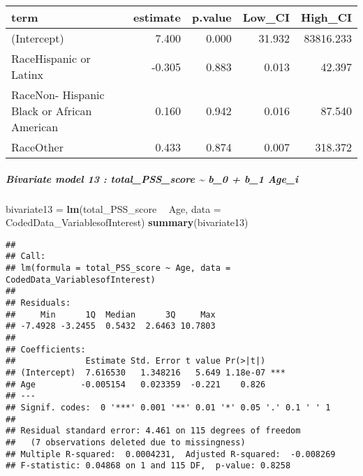 \documentclass[]{article}
\newenvironment{Shaded}{\begin{snugshade}}{\end{snugshade}}
\newcommand{\DataTypeTok}[1]{\textcolor[rgb]{0.13,0.29,0.53}{#1}}
\newcommand{\DecValTok}[1]{\textcolor[rgb]{0.00,0.00,0.81}{#1}}
\newcommand{\FloatTok}[1]{\textcolor[rgb]{0.00,0.00,0.81}{#1}}
\newcommand{\KeywordTok}[1]{\textcolor[rgb]{0.13,0.29,0.53}{\textbf{#1}}}
\newcommand{\NormalTok}[1]{#1}
\newcommand{\OperatorTok}[1]{\textcolor[rgb]{0.81,0.36,0.00}{\textbf{#1}}}
\newcommand{\StringTok}[1]{\textcolor[rgb]{0.31,0.60,0.02}{#1}}
\let\oldsubparagraph\subparagraph
\renewcommand{\subparagraph}[1]{\oldsubparagraph{#1}\mbox{}}
\begin{document}
\begin{Shaded}
\end{Shaded}

\begin{longtable}[]{@{}lrrrr@{}}
\toprule
term & estimate & p.value & Low\_CI & High\_CI\tabularnewline
\midrule
\endhead
(Intercept) & 7.400 & 0.000 & 31.932 & 83816.233\tabularnewline
RaceHispanic or Latinx & -0.305 & 0.883 & 0.013 & 42.397\tabularnewline
RaceNon- Hispanic Black or African American & 0.160 & 0.942 & 0.016 &
87.540\tabularnewline
RaceOther & 0.433 & 0.874 & 0.007 & 318.372\tabularnewline
\bottomrule
\end{longtable}

\hypertarget{bivariate-model-13-total_pss_score-b_0-b_1-age_i}{%
\subparagraph{Bivariate model 13 : total\_PSS\_score \textasciitilde{}
b\_0 + b\_1
Age\_i}\label{bivariate-model-13-total_pss_score-b_0-b_1-age_i}}

\begin{Shaded}
\begin{Highlighting}[]
\NormalTok{bivariate13 =}\StringTok{ }\KeywordTok{lm}\NormalTok{(total_PSS_score }\OperatorTok{~}\StringTok{ }\NormalTok{Age, }\DataTypeTok{data =}\NormalTok{ CodedData_VariablesofInterest)}
\KeywordTok{summary}\NormalTok{(bivariate13)}
\end{Highlighting}
\end{Shaded}

\begin{verbatim}
## 
## Call:
## lm(formula = total_PSS_score ~ Age, data = CodedData_VariablesofInterest)
## 
## Residuals:
##     Min      1Q  Median      3Q     Max 
## -7.4928 -3.2455  0.5432  2.6463 10.7803 
## 
## Coefficients:
##              Estimate Std. Error t value Pr(>|t|)    
## (Intercept)  7.616530   1.348216   5.649 1.18e-07 ***
## Age         -0.005154   0.023359  -0.221    0.826    
## ---
## Signif. codes:  0 '***' 0.001 '**' 0.01 '*' 0.05 '.' 0.1 ' ' 1
## 
## Residual standard error: 4.461 on 115 degrees of freedom
##   (7 observations deleted due to missingness)
## Multiple R-squared:  0.0004231,  Adjusted R-squared:  -0.008269 
## F-statistic: 0.04868 on 1 and 115 DF,  p-value: 0.8258
\end{verbatim}
\end{document}
